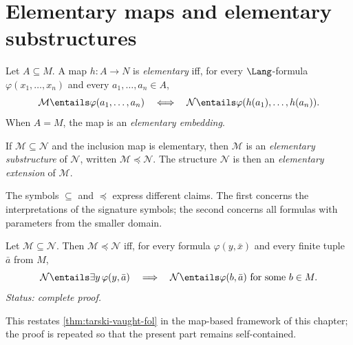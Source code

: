 \section{Elementary maps and elementary substructures}
\label{sec:maps-elementarity-03}

\begin{definition}
Let \(A\subseteq M\).  A map \(h:A\to N\) is \emph{elementary} iff, for every
\(\Lang\)-formula \(\varphi(x_1,\ldots,x_n)\) and every
\(a_1,\ldots,a_n\in A\),
\[
  \mathcal M\entails\varphi(a_1,\ldots,a_n)
  \quad\Longleftrightarrow\quad
  \mathcal N\entails\varphi(h(a_1),\ldots,h(a_n)).
\]
When \(A=M\), the map is an \emph{elementary embedding}.
\end{definition}

\begin{definition}
If \(\mathcal M\subseteq\mathcal N\) and the inclusion map is elementary,
then \(\mathcal M\) is an \emph{elementary substructure} of \(\mathcal N\),
written \(\mathcal M\preccurlyeq\mathcal N\).  The structure
\(\mathcal N\) is then an \emph{elementary extension} of \(\mathcal M\).
\end{definition}

\begin{remark}
The symbols \(\subseteq\) and \(\preccurlyeq\) express different claims.
The first concerns the interpretations of the signature symbols; the second
concerns all formulas with parameters from the smaller domain.
\end{remark}

\begin{theorem}
\label{thm:tarski-vaught}
Let \(\mathcal M\subseteq\mathcal N\).  Then
\(\mathcal M\preccurlyeq\mathcal N\) iff, for every formula
\(\varphi(y,\bar x)\) and every finite tuple \(\bar a\) from \(M\),
\[
  \mathcal N\entails\exists y\,\varphi(y,\bar a)
  \quad\Longrightarrow\quad
  \mathcal N\entails\varphi(b,\bar a)
  \text{ for some }b\in M.
\]
\textit{Status: complete proof.}
\end{theorem}

This restates \cref{thm:tarski-vaught-fol} in the map-based framework of
this chapter; the proof is repeated so that the present part remains
self-contained.

